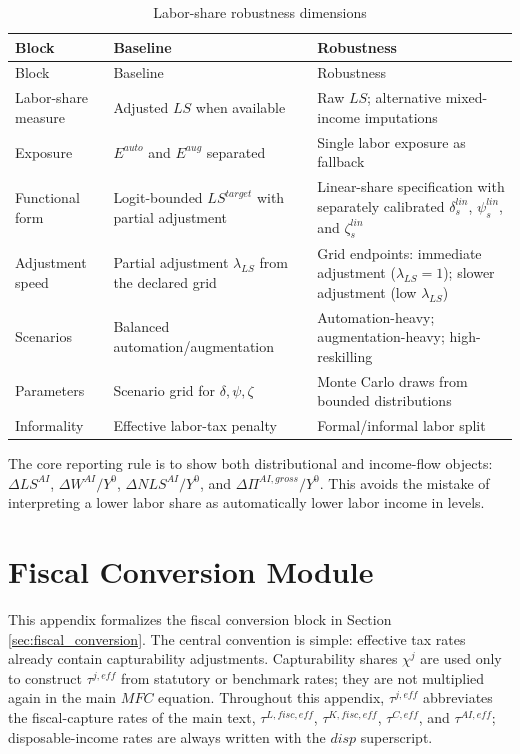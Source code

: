 \documentclass[11pt,a4paper]{article}
\begin{document}
\begin{longtable}{p{}p{}p{}}
\caption{Labor-share robustness dimensions}\label{tab:labor_share_robustness}\\
\toprule
Block & Baseline & Robustness \\
\midrule
\endfirsthead
\toprule
Block & Baseline & Robustness \\
\midrule
\endhead
Labor-share measure & Adjusted $LS$ when available & Raw $LS$; alternative mixed-income imputations \\
Exposure & $E^{auto}$ and $E^{aug}$ separated & Single labor exposure as fallback \\
Functional form & Logit-bounded $LS^{target}$ with partial adjustment & Linear-share specification with separately calibrated $\delta^{lin}_s$, $\psi^{lin}_s$, and $\zeta^{lin}_s$ \\
Adjustment speed & Partial adjustment $\lambda_{LS}$ from the declared grid & Grid endpoints: immediate adjustment ($\lambda_{LS}=1$); slower adjustment (low $\lambda_{LS}$) \\
Scenarios & Balanced automation/augmentation & Automation-heavy; augmentation-heavy; high-reskilling \\
Parameters & Scenario grid for $\delta,\psi,\zeta$ & Monte Carlo draws from bounded distributions \\
Informality & Effective labor-tax penalty & Formal/informal labor split \\
\bottomrule
\end{longtable}

The core reporting rule is to show both distributional and income-flow objects: $\Delta LS^{AI}$, $\Delta W^{AI}/Y^0$, $\Delta NLS^{AI}/Y^0$, and $\Delta \Pi^{AI,gross}/Y^0$. This avoids the mistake of interpreting a lower labor share as automatically lower labor income in levels.


\section{Fiscal Conversion Module}\label{app:fiscal_conversion_module}

This appendix formalizes the fiscal conversion block in Section \ref{sec:fiscal_conversion}. The central convention is simple: effective tax rates already contain capturability adjustments. Capturability shares $\chi^j$ are used only to construct $\tau^{j,eff}$ from statutory or benchmark rates; they are not multiplied again in the main $MFC$ equation. Throughout this appendix, $\tau^{j,eff}$ abbreviates the fiscal-capture rates of the main text, $\tau^{L,fisc,eff}$, $\tau^{K,fisc,eff}$, $\tau^{C,eff}$, and $\tau^{AI,eff}$; disposable-income rates are always written with the $disp$ superscript.
\end{document}
